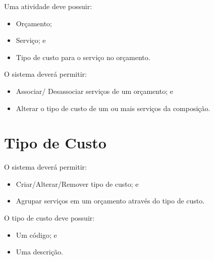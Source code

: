 Uma atividade deve possuir:

\begin{itemize}
	\item Orçamento;
	\item Serviço; e
	\item Tipo de custo para o serviço no orçamento.
\end{itemize}

O sistema deverá permitir:

\begin{itemize}
	\item Associar/ Desassociar serviços de um orçamento; e
	\item Alterar o tipo de custo de um ou mais serviços da composição.
\end{itemize}

\section{Tipo de Custo}

O sistema deverá permitir:

\begin{itemize}
	\item Criar/Alterar/Remover tipo de custo; e
	\item Agrupar serviços em um orçamento através do tipo de custo.
\end{itemize}

O tipo de custo deve possuir:

\begin{itemize}
	\item Um código; e
	\item Uma descrição.
\end{itemize}
